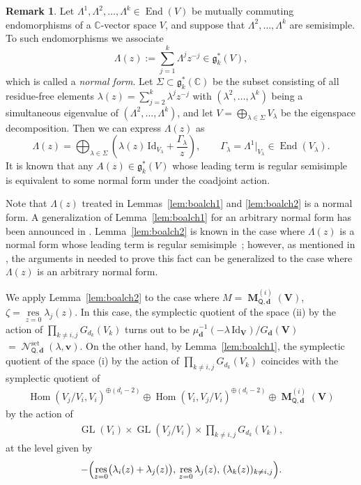 \documentclass[pdftex]{sigma}
\numberwithin{equation}{section}
\theoremstyle{definition}
\newtheorem{Remark}[Theorem]{Remark}
\newcommand{\lemref}[1]{Lemma~\ref{#1}}
\newcommand{\C}{\mathbb{C}} %
\newcommand{\GL}{\operatorname{GL}} %
\newcommand{\g}{\mathfrak{g}} %
\newcommand{\End}{\operatorname{End}}
\newcommand{\Hom}{\operatorname{Hom}}
\newcommand{\unit}{\mathrm{Id}}
\newcommand{\bM}{\operatorname{\mathbf{M}}}
\newcommand{\bV}{\mathbf{V}}
\newcommand{\bv}{\mathbf{v}}
\newcommand{\res}{\operatorname*{res}}
\newcommand{\ved}{\mathbf{d}}
\newcommand{\Qset}{\operatorname{\mathscr{N}}^\mathrm{set}}
\newcommand{\QQ}{\mathsf{Q}} %
\begin{document}
\begin{Remark}\label{rem:HTL}
Let $\Lambda^1, \Lambda^2, \dots , \Lambda^k \in \End(V)$ be
mutually commuting endomorphisms of
a $\C$-vector space $V$,
and suppose that $\Lambda^2, \dots ,\Lambda^k$ are semisimple.
To such endomorphisms we associate
\[
\Lambda(z) := \sum_{j=1}^k \Lambda^j z^{-j} \in \g^*_k(V),
\]
which is called a {\em normal form}.
Let $\Sigma \subset \g^*_k(\C)$ be the subset consisting of all
residue-free elements $\lambda(z)=\sum\limits_{j=2}^k \lambda^j z^{-j}$
with $(\lambda^2, \dots ,\lambda^k)$
being a simultaneous eigenvalue of $(\Lambda^2,\dots ,\Lambda^k)$,
and let $V=\bigoplus_{\lambda \in \Sigma} V_\lambda$
be the eigenspace decomposition.
Then we can express $\Lambda(z)$ as
\[
\Lambda(z)=\bigoplus_{\lambda \in \Sigma}
\left( \lambda(z)\,\unit_{V_\lambda} + \frac{\Gamma_\lambda}{z} \right),
\qquad \Gamma_\lambda=\Lambda^1 |_{V_\lambda} \in \End(V_\lambda).
\]
It is known that any $A(z) \in \g^*_k(V)$ whose leading term
is regular semisimple is equivalent to
some normal form under the coadjoint action.

Note that $\Lambda(z)$ treated in
Lemmas~\ref{lem:boalch1} and \ref{lem:boalch2}
is a normal form.
A generalization of \lemref{lem:boalch1}
for an arbitrary normal form
has been announced in \cite[Appendix~C]{0806.1050}.
\lemref{lem:boalch2} is known
in the case where $\Lambda(z)$ is a normal form
whose leading term is regular semisimple~\cite{MR1864833};
however, as mentioned in \cite{0806.1050},
the arguments in \cite[Section~2]{MR1864833}
needed to prove this fact can be generalized
to the case where $\Lambda(z)$ is an arbitrary normal form.
\end{Remark}

We apply \lemref{lem:boalch2} to the case where
$M=\bM^{(i)}_{\QQ,\ved}(\bV)$, $\zeta=\res\limits_{z=0}\lambda_j(z)$.
In this case, the symp\-lectic quotient of the space (ii) by
the action of $\prod\limits_{k \neq i,j} G_{d_k}(V_k)$
turns out to be
$\mu_\ved^{-1}(-\lambda\,\unit_\bV)/G_\ved(\bV)$ $=\Qset_{\QQ,\ved}(\lambda,\bv)$.
On the other hand, by \lemref{lem:boalch1},
the symplectic quotient of the space (i) by
the action of $\prod\limits_{k \neq i,j} G_{d_k}(V_k)$
coincides with the symplectic quotient of
\begin{gather}\label{eq:normalization1}
\Hom(V_j/V_i,V_i)^{\oplus (d_i-2)} \oplus \Hom(V_i,V_j/V_i)^{\oplus (d_i-2)}
\oplus \bM^{(i)}_{\QQ,\ved}(\bV)
\end{gather}
by the action of
\begin{gather}\label{eq:normalization2}
\GL(V_i) \times \GL(V_j/V_i) \times \prod_{k \neq i,j} G_{d_k}(V_k),
\end{gather}
at the level given by
\begin{gather}\label{eq:normalization3}
-\Bigl( \res_{z=0} \bigl( \lambda_i(z) + \lambda_j(z) \bigr),\,
\res_{z=0} \lambda_j(z),\,
(\lambda_k(z))_{k \neq i,j} \Bigr).
\end{gather}
\end{document}
